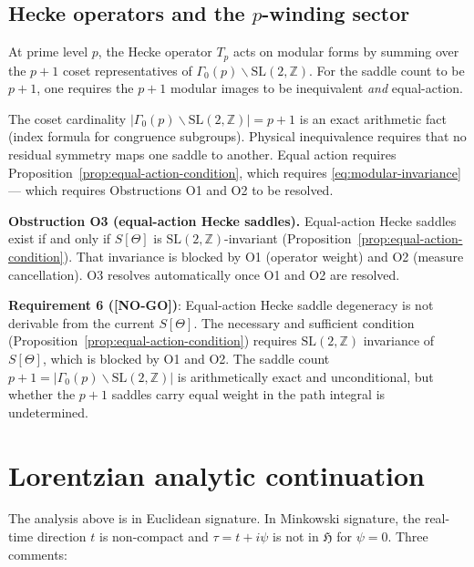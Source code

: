 \documentclass[12pt,a4paper]{article}
\theoremstyle{definition}
\theoremstyle{remark}
\newcommand{\NOGO}{\textcolor{red!80!black}{\textbf{[NO-GO]}}}
\newcommand{\SL}{\mathrm{SL}}
\newcommand{\ZZ}{\mathbb{Z}}
\newcommand{\HH}{\mathfrak{H}}
\begin{document}
\subsection{Hecke operators and the $p$-winding sector}

At prime level $p$, the Hecke operator $T_p$ acts on modular forms by
summing over the $p+1$ coset representatives of $\Gamma_0(p)\backslash\SL(2,\ZZ)$.
For the saddle count to be $p+1$, one requires the $p+1$ modular images to
be inequivalent \emph{and} equal-action.

The coset cardinality $|\Gamma_0(p)\backslash\SL(2,\ZZ)|=p+1$ is an
exact arithmetic fact (index formula for congruence subgroups).  Physical
inequivalence requires that no residual symmetry maps one saddle to another.
Equal action requires Proposition~\ref{prop:equal-action-condition}, which
requires \eqref{eq:modular-invariance} — which requires Obstructions O1 and
O2 to be resolved.

\begin{gapbox}
\textbf{Obstruction O3 (equal-action Hecke saddles).}
Equal-action Hecke saddles exist if and only if $S[\Theta]$ is
$\SL(2,\ZZ)$-invariant (Proposition~\ref{prop:equal-action-condition}).
That invariance is blocked by O1 (operator weight) and O2 (measure
cancellation).  O3 resolves automatically once O1 and O2 are resolved.
\end{gapbox}

\begin{resultbox}
\textbf{Requirement 6 (\NOGO)}: Equal-action Hecke saddle degeneracy is
not derivable from the current $S[\Theta]$.  The necessary and sufficient
condition (Proposition~\ref{prop:equal-action-condition}) requires
$\SL(2,\ZZ)$ invariance of $S[\Theta]$, which is blocked by O1 and O2.
The saddle count $p+1=|\Gamma_0(p)\backslash\SL(2,\ZZ)|$ is
arithmetically exact and unconditional, but whether the $p+1$ saddles
carry equal weight in the path integral is undetermined.
\end{resultbox}

\section{Lorentzian analytic continuation}
\label{sec:continuation}

The analysis above is in Euclidean signature.  In Minkowski signature, the
real-time direction $t$ is non-compact and $\tau=t+i\psi$ is not in $\HH$
for $\psi=0$.  Three comments:
\end{document}
